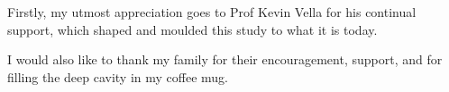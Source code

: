 \begin{acknowledgements}
Firstly, my utmost appreciation goes to Prof Kevin Vella for his continual support,
which shaped and moulded this study to what it is today.

I would also like to thank my family for their encouragement, support, and for
filling the deep cavity in my coffee mug.
\end{acknowledgements}